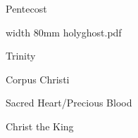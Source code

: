\bigskip

\eject


\paginaproxima

\beginpart Pentecost


\bigskip

\saveimageresource width 80mm {holyghost.pdf}

\centerline{\useimageresource \lastsavedimageresourceindex}



\bigskip

\eject


\paginaproxima

\beginpart Trinity



\paginaproxima

\beginpart Corpus Christi


\bigskip



\paginaproxima


\bigskip



\bigskip

\eject


\paginaproxima

\beginpart Sacred Heart/Precious Blood



\bigskip



\bigskip



\eject

\beginpart Christ the King


\bigskip




%

